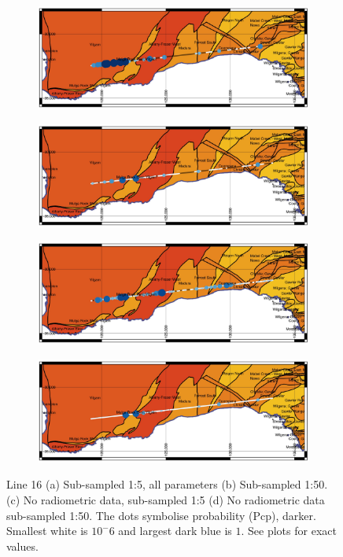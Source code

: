 	\begin{figure}
		\centering
		\begin{subfigure}[b]{1\textwidth}
			\centering
			\includegraphics[width=0.78\linewidth]{../fig/maps/Line_16_S5_T100}
			\caption{}
			\label{fig:Ng1} 
		\end{subfigure}

		\begin{subfigure}[b]{1\textwidth}
			\centering
			\includegraphics[width=0.78\linewidth]{../fig/maps/Line_16_S50_T100}
			\caption{}
			\label{fig:Ng2}
		\end{subfigure}

		
		\begin{subfigure}[b]{1\textwidth}
			\centering
			\includegraphics[width=0.78\linewidth]{../fig/maps/Line_16_S5_T100_No_Radio}
			\caption{}
			\label{fig:Ng3}
		\end{subfigure}
		
		\begin{subfigure}[b]{1\textwidth}
			\centering
			\includegraphics[width=0.78\linewidth]{../fig/maps/Line_16_S50_T100_No_Radio}
			\caption{}
			\label{fig:Ng4}
		\end{subfigure}		
		

		\caption[Resampling and radiometry compararasion for Line 16]{Line 16 (a) Sub-sampled 1:5, all parameters (b) Sub-sampled 1:50. (c) No radiometric data, sub-sampled 1:5 (d) No radiometric data sub-sampled 1:50. The dots symbolise probability (Pcp), darker. Smallest white is $10^-6$ and largest dark blue is $1$. See plots for exact values. }
	\end{figure}


